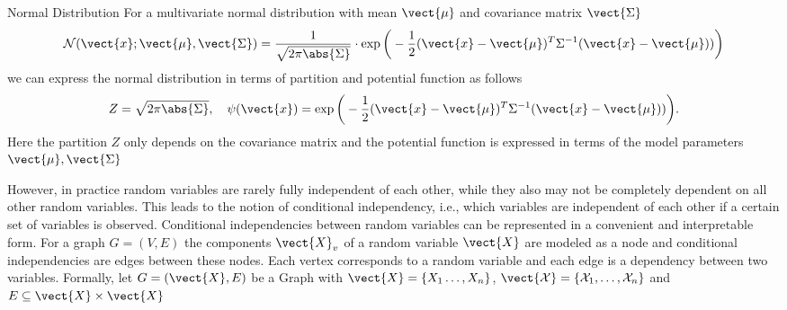 \begin{example}{Normal Distribution}
    For a multivariate normal distribution with mean $\vect{\mu}$ and covariance matrix $\vect{\Sigma}$
    \begin{equation}
        \mathcal{N}(\vect{x}; \vect{\mu}, \vect{\Sigma}) = \frac{1}{\sqrt{2 \pi \abs{\Sigma}}} \cdot \exp\bigg(-\frac{1}{2} (\vect{x} - \vect{\mu})^T \Sigma^{-1}(\vect{x} - \vect{\mu}))\bigg)
    \end{equation}
    we can express the normal distribution in terms of partition and potential function as follows
    \begin{equation}
        Z = \sqrt{2 \pi \abs{\Sigma}}, \quad \psi(\vect{x}) = \exp\bigg(-\frac{1}{2} (\vect{x} - \vect{\mu})^T \Sigma^{-1}(\vect{x} - \vect{\mu}))\bigg).
    \end{equation}
    Here the partition $Z$ only depends on the covariance matrix and the potential function is expressed in terms of the model parameters $\vect{\mu}, \vect{\Sigma}$
\end{example}

However, in practice random variables are rarely fully independent of each other, while they also may not be completely dependent on all other random variables.
This leads to the notion of conditional independency, i.e., which variables are independent of each other if a certain set of variables is observed.
Conditional independencies between random variables can be represented in a convenient and interpretable form.
For a graph $G=(V,E)$ the components $\vect{X}_v$ of a random variable $\vect{X}$ are modeled as a node and conditional independencies are edges between these nodes.
Each vertex corresponds to a random variable and each edge is a dependency between two variables.
Formally, let $G = (\vect{X},E)$ be a Graph with $\vect{X} =\{X_1 \ldots, X_n\}$, $\vect{\mathcal{X}} = \{\mathcal{X}_1, \ldots, \mathcal{X}_n\}$ and $E \subseteq \vect{X} \times \vect{X}$

